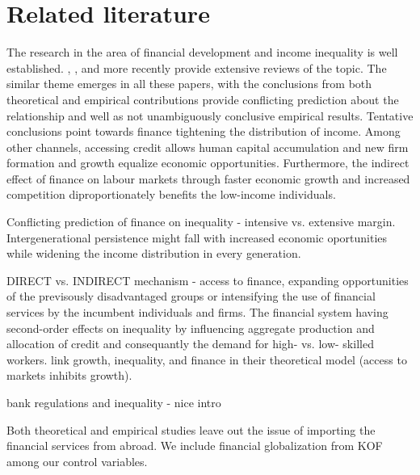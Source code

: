 \documentclass[a4paper,11pt]{article}
\begin{document}
\section{Related literature}
The research in the area of financial development and income inequality is well established. \citet{demirgucc2009finance}, \citet{claessens2007finance}, and more recently \cite{de2017finance} provide extensive reviews of the topic. The similar theme emerges in all these papers, with the conclusions from both theoretical and empirical contributions provide conflicting prediction about the relationship and well as not unambiguously conclusive empirical results. Tentative conclusions point towards finance tightening the distribution of income. Among other channels, accessing credit allows human capital accumulation and new firm formation and growth equalize economic opportunities. Furthermore, the indirect effect of finance on labour markets through faster economic growth and increased competition diproportionately benefits the low-income individuals.

Conflicting prediction of finance on inequality - intensive vs. extensive margin. Intergenerational persistence might fall with increased economic oportunities while widening the income distribution in every generation.

DIRECT vs. INDIRECT mechanism - access to finance, expanding opportunities of the previsously disadvantaged groups or intensifying the use of financial services by the incumbent individuals and firms. The financial system having second-order effects on inequality by influencing aggregate production and allocation of credit and consequantly the demand for high- vs. low- skilled workers. \citet{braunetal2019} link growth, inequality, and finance in their theoretical model (access to markets inhibits growth).

\citet{delis2014} bank regulations and inequality - nice intro


Both theoretical and empirical studies leave out the issue of importing the financial services from abroad. We include financial globalization from KOF among our control variables.
\end{document}
